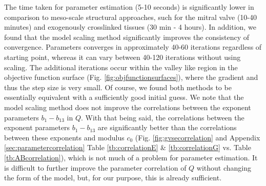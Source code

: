     The time taken for parameter estimation (5-10 seconds) is significantly lower in comparison to meso-scale structural approaches, such for the mitral valve \cite{zhang_meso_2016} (10-40 minutes) and exogenously crosslinked tissues \cite{zhang_modeling_2017}(30 min - 4 hours). In addition, we found that the model scaling method significantly improves the consistency of convergence. Parameters converges in approximately 40-60 iterations regardless of starting point, whereas it can vary between 40-120 iterations without using scaling. The additional iterations occur within the valley like region in the objective function surface (Fig. \ref{fig:objfunctionsurfaces}), where the gradient and thus the step size is very small. Of course, we found both methods to be essentially equivalent with a sufficiently good initial guess. We note that the model scaling method does not improve the correlations between the exponent parameters $b_1-b_{13}$ in $Q$. With that being said, the correlations between the exponent parameters $b_1-b_{13}$ are significantly better than the correlations between these exponents and modulus $c_0$ (Fig. \ref{fig:gvsecorrelation} and Appendix \ref{sec:parametercorrelation} Table \ref{tb:correlationE} \& \ref{tb:correlationG} vs. Table \ref{tb:ABcorrelation}), which is not much of a problem for parameter estimation. It is difficult to further improve the parameter correlation of $Q$ without changing the form of the model, but, for our purpose, this is already sufficient. 
    
